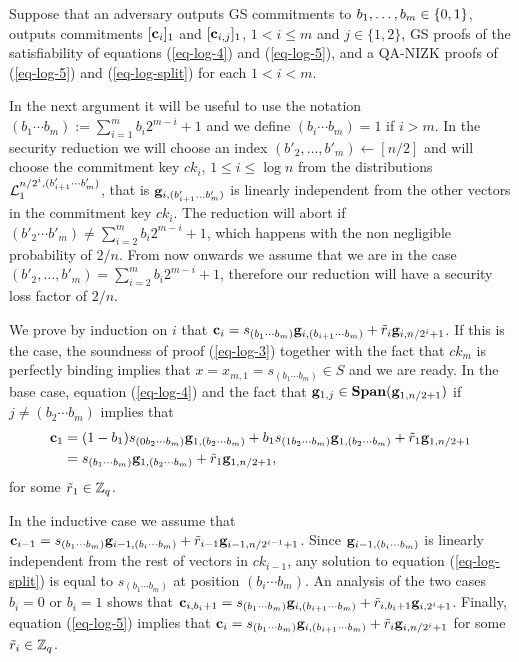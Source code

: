 Suppose that an adversary outputs GS commitments to $b_1,\ldots,b_{m}\in\{0,1\}$, outputs commitments $[\mathbf{c}_i]_1$ and $[\mathbf{c}_{i,j}]_1$, $1< i\leq m$ and $j\in\{1,2\}$, GS proofs of the satisfiability of equations (\ref{eq-log-4}) and (\ref{eq-log-5}), and a QA-NIZK proofs of (\ref{eq-log-5}) and (\ref{eq-log-split}) for each $1<i<m$.

In the next argument it will be useful to use the notation $(b_1\cdots b_m):=\sum_{i=1}^{m}b_i2^{m-i}+1$ and we define $(b_i\cdots b_m)=1$ if $i>m$.
In the security reduction we will choose an index $(b'_2,\ldots,b'_m)\gets[n/2]$ and will choose the commitment key $ck_i$, $1\leq i \leq \log n$ from the distributions $\mathcal{L}_1^{n/2^i,(b'_{i+1}\cdots b'_m)}$, that is $\mathbf{g}_{i,(b'_{i+1}\ldots b'_m)}$ is linearly independent from the other vectors in the commitment key $ck_i$. The reduction will abort if $(b'_2\cdots b'_m)\neq\sum_{i=2}^{m} b_i2^{m-i}+1$, which happens with the non negligible probability of $2/n$. From now onwards we assume that we are in the case $(b'_2,\ldots,b'_m)=\sum_{i=2}^{m} b_i2^{m-i}+1$, therefore our reduction will have a security loss factor of $2/n$.

We prove by induction on $i$ that $\mathbf{c}_i=s_{(b_1\cdots b_m)}\mathbf{g}_{i,(b_{i+1}\cdots b_m)}+\tilde{r}_i\mathbf{g}_{i,n/2^i+1}$. If this is the case, the soundness of proof (\ref{eq-log-3}) together with the fact that $ck_m$ is perfectly binding implies that $x=x_{m,1}=s_{(b_1\cdots b_m)}\in S$ and we are ready. In the base case, equation (\ref{eq-log-4}) and the fact that $\mathbf{g}_{1,j}\in\mathbf{Span}(\mathbf{g}_{1,n/2+1})$ if $j\neq (b_2\cdots b_m)$ implies that 
\begin{align*}
\mathbf{c}_1 &= (1-b_1)s_{(0b_2\cdots b_m)} \mathbf{g}_{1,(b_2\cdots b_m)}+b_1s_{(1b_2\cdots b_m)}\mathbf{g}_{1,(b_2\cdots b_m)}+\tilde{r}_1\mathbf{g}_{1,n/2+1}\\
&=s_{(b_1\cdots b_m)}\mathbf{g}_{1,(b_2\cdots b_m)}+\tilde{r}_1\mathbf{g}_{1,n/2+1},
\end{align*} for some $\tilde{r}_1\in\mathbb{Z}_q$.

In the inductive case we assume that $\mathbf{c}_{i-1}=s_{(b_1\cdots b_m)}\mathbf{g}_{i-1,(b_i\cdots b_m)}+\tilde{r}_{i-1}\mathbf{g}_{i-1,n/2^{i-1}+1}$. Since $\mathbf{g}_{i-1,(b_i\cdots b_m)}$ is linearly independent from the rest of vectors in $ck_{i-1}$, any solution to equation (\ref{eq-log-split}) is equal to $s_{(b_1\cdots b_m)}$ at position $(b_i\cdots b_m)$. An analysis of the two cases $b_i=0$ or $b_i=1$ shows that $\mathbf{c}_{i,b_i+1}=s_{(b_1\cdots b_m)}\mathbf{g}_{i,(b_{i+1}\cdots b_m)}+\tilde{r}_{i,b_i+1}\mathbf{g}_{i,2^i+1}$. Finally, equation (\ref{eq-log-5}) implies that $\mathbf{c}_i=s_{(b_1\cdots b_m)}\mathbf{g}_{i,(b_{i+1}\cdots b_m)}+\tilde{r}_i\mathbf{g}_{i,n/2^i+1}$ for some $\tilde{r}_{i}\in\mathbb{Z}_q$.

